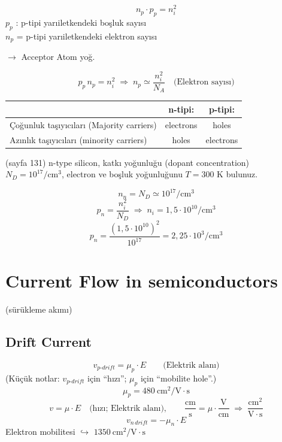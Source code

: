 \documentclass[11pt,a4paper]{article}
\begin{document}
\[ n_p \cdot p_p = n_i^2 \]
$p_p$ : p-tipi yarıiletkendeki boşluk sayısı\\
$n_p$ = p-tipi yarıiletkendeki elektron sayısı

\medskip
\noindent{}

\medskip
\noindent {}

\noindent {} $\rightarrow$ Acceptor Atom yoğ.

\[ p_p\, n_p = n_i^2 \;\Rightarrow\; \boxed{n_p \simeq \frac{n_i^2}{N_A}} \quad \text{(Elektron sayısı)} \]

\begin{center}
\begin{tabular}{lcc}
  \toprule
   & n-tipi: & p-tipi: \\ \midrule
  Çoğunluk taşıyıcıları (Majority carriers) & electrons & holes \\
  Azınlık taşıyıcıları (minority carriers) & holes & electrons \\ \bottomrule
\end{tabular}
\end{center}

\begin{ornek}[3.2]
  (sayfa 131) n-type silicon, katkı yoğunluğu (dopant concentration) $N_D = 10^{17}/\mathrm{cm}^3$,
  electron ve boşluk yoğunluğunu $T = 300$ K bulunuz.
\end{ornek}
\begin{cozum}
  \[ n_n = N_D \simeq 10^{17}/\mathrm{cm}^3 \]
  \[ p_n = \frac{n_i^2}{N_D} \;\Rightarrow\; n_i = 1{,}5\cdot10^{10}/\mathrm{cm}^3 \]
  \[ p_n = \frac{(1{,}5\cdot10^{10})^2}{10^{17}} = 2{,}25\cdot10^{3}/\mathrm{cm}^3 \]
\end{cozum}

\section{Current Flow in semiconductors}
(sürükleme akımı)
\subsection{Drift Current}
\[ v_{p\text{-}drift} = \mu_p \cdot E \qquad \text{(Elektrik alanı)} \]
{\small\color{kursunkalem}(Küçük notlar: $v_{p\text{-}drift}$ için ``hızı''; $\mu_p$ için ``mobilite hole''.)}
\[ \mu_p = 480\ \mathrm{cm^2/V\!\cdot\!s} \]
\[ v = \mu\cdot E \quad \text{(hızı; Elektrik alanı)}, \qquad
   \frac{\mathrm{cm}}{\mathrm{s}} = \mu\cdot\frac{\mathrm{V}}{\mathrm{cm}} \;\Rightarrow\; \frac{\mathrm{cm}^2}{\mathrm{V\cdot s}} \]
\[ v_{n\,drift} = -\mu_n \cdot E \]
Elektron mobilitesi $\hookrightarrow$ $1350\ \mathrm{cm^2/V\!\cdot\!s}$
\end{document}
